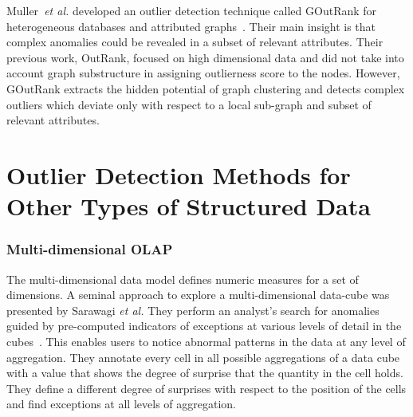  Muller~{\em et al.} developed an outlier detection technique called GOutRank for heterogeneous databases and attributed graphs~\cite{MullerSMB13}. Their main insight is that complex anomalies could be revealed in a subset of relevant attributes. Their previous work, OutRank, focused on high dimensional data and did not take into account graph substructure in assigning outlierness score to the nodes. However, GOutRank extracts the hidden potential of graph clustering and detects complex outliers which deviate only with respect to a local sub-graph and subset of relevant attributes. 
\section{Outlier Detection Methods for Other Types of Structured Data}
\subsubsection{Multi-dimensional OLAP}
The multi-dimensional data model defines numeric measures for a set of dimensions. A seminal approach to explore a multi-dimensional data-cube was presented by Sarawagi {\em et al.} They perform an analyst's search for anomalies guided by pre-computed indicators of exceptions at various levels of detail in the cubes~\cite{Sarawagi98}. This enables users to notice abnormal patterns in the data at any level of aggregation. They annotate every cell in all possible aggregations of a data cube with a value that shows the degree of surprise that the quantity in the cell holds. They define a different degree of surprises with respect to the position of the cells and find exceptions at all levels of aggregation.

